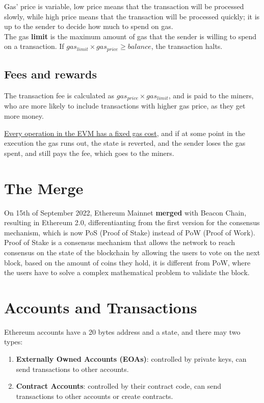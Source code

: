 Gas' price is variable, low price means that the transaction will be processed slowly, while high price means that the transaction will be processed quickly; it is up to the sender to decide how much to spend on gas.\\
The gas \textbf{limit} is the maximum amount of gas that the sender is willing to spend on a transaction.
If $gas_{limit} \times gas_{price} \geq balance$, the transaction halts.


\subsection{Fees and rewards}
The transaction fee is calculated as $gas_{price} \times gas_{limit}$, and is paid to the miners, who are more likely to include transactions with higher gas price, as they get more money.

\ul{Every operation in the EVM has a fixed gas cost}, and if at some point in the execution the gas runs out, the state is reverted, and the sender loses the gas spent, and still pays the fee, which goes to the miners.

\section{The Merge}
On 15th of September 2022, Ethereum Mainnet \textbf{merged} with Beacon Chain, resulting in Ethereum 2.0, differentianting from the first version for the consensus mechanism, which is now PoS (Proof of Stake) instead of PoW (Proof of Work).\\
Proof of Stake is a consensus mechanism that allows the network to reach consensus on the state of the blockchain by allowing the users to vote on the next block, based on the amount of coins they hold, it is different from PoW, where the users have to solve a complex mathematical problem to validate the block.

\section{Accounts and Transactions}
{Ethereum accounts have a 20 bytes address and a state, and there may two types:\ns
\begin{enumerate}
   \item \textbf{Externally Owned Accounts (EOAs)}: controlled by private keys, can send transactions to other accounts.
   \item \textbf{Contract Accounts}: controlled by their contract code, can send transactions to other accounts or create contracts.
\end{enumerate}} 

